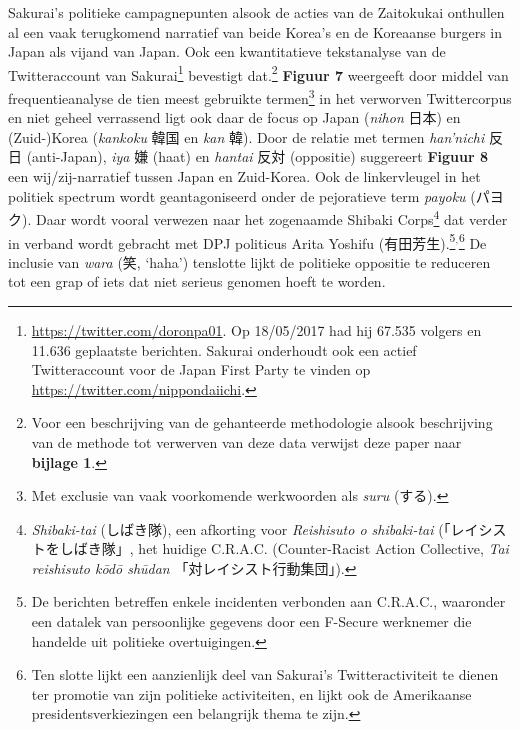 \documentclass[10.5pt,dutch,]{article}
\begin{document}
Sakurai's politieke campagnepunten alsook de acties van de Zaitokukai
onthullen al een vaak terugkomend narratief van beide Korea's en de
Koreaanse burgers in Japan als vijand van Japan. Ook een kwantitatieve
tekstanalyse van de Twitteraccount van Sakurai\footnote{\url{https://twitter.com/doronpa01}.
  Op 18/05/2017 had hij 67.535 volgers en 11.636 geplaatste berichten.
  Sakurai onderhoudt ook een actief Twitteraccount voor de Japan First
  Party te vinden op \url{https://twitter.com/nippondaiichi}.} bevestigt
dat.\footnote{Voor een beschrijving van de gehanteerde methodologie
  alsook beschrijving van de methode tot verwerven van deze data
  verwijst deze paper naar \textbf{bijlage 1}.} \textbf{Figuur 7}
weergeeft door middel van frequentieanalyse de tien meest gebruikte
termen\footnote{Met exclusie van vaak voorkomende werkwoorden als
  \emph{suru} (する).} in het verworven Twittercorpus en niet geheel
verrassend ligt ook daar de focus op Japan (\emph{nihon} 日本) en
(Zuid-)Korea (\emph{kankoku} 韓国 en \emph{kan} 韓). Door de relatie met
termen \emph{han'nichi} 反日 (anti-Japan), \emph{iya} 嫌 (haat) en
\emph{hantai} 反対 (oppositie) suggereert \textbf{Figuur 8} een
wij/zij-narratief tussen Japan en Zuid-Korea. Ook de linkervleugel in
het politiek spectrum wordt geantagoniseerd onder de pejoratieve term
\emph{payoku} (パヨク). Daar wordt vooral verwezen naar het zogenaamde
Shibaki Corps\footnote{\emph{Shibaki-tai} (しばき隊), een afkorting voor
  \emph{Reishisuto o shibaki-tai} (「レイシストをしばき隊」, het huidige
  C.R.A.C. (Counter-Racist Action Collective, \emph{Tai reishisuto kōdō
  shūdan} 「対レイシスト行動集団」).} dat verder in verband wordt
gebracht met DPJ politicus Arita Yoshifu (有田芳生).\footnote{De
  berichten betreffen enkele incidenten verbonden aan C.R.A.C.,
  waaronder een datalek van persoonlijke gegevens door een F-Secure
  werknemer die handelde uit politieke overtuigingen.}$^{,}$\footnote{Ten
  slotte lijkt een aanzienlijk deel van Sakurai's Twitteractiviteit te
  dienen ter promotie van zijn politieke activiteiten, en lijkt ook de
  Amerikaanse presidentsverkiezingen een belangrijk thema te zijn.} De
inclusie van \emph{wara} (笑, `haha') tenslotte lijkt de politieke
oppositie te reduceren tot een grap of iets dat niet serieus genomen
hoeft te worden.
\end{document}
